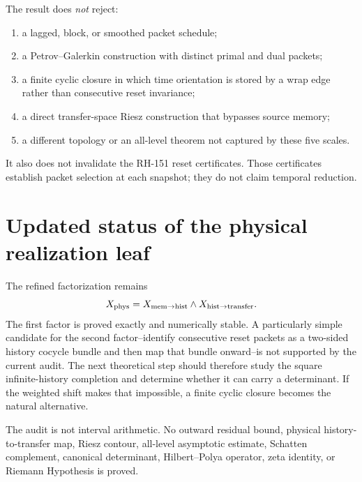 \documentclass[12pt]{article}
\theoremstyle{remark}
\begin{document}
The result does \emph{not} reject:
\begin{enumerate}[leftmargin=2em]
\item a lagged, block, or smoothed packet schedule;
\item a Petrov--Galerkin construction with distinct primal and dual packets;
\item a finite cyclic closure in which time orientation is stored by a wrap
edge rather than consecutive reset invariance;
\item a direct transfer-space Riesz construction that bypasses source memory;
\item a different topology or an all-level theorem not captured by these
five scales.
\end{enumerate}
It also does not invalidate the RH-151 reset certificates.  Those certificates
establish packet selection at each snapshot; they do not claim temporal
reduction.

\section{Updated status of the physical realization leaf}

The refined factorization remains
\[
 X_{\rm phys}
 =X_{\rm mem\to hist}\wedge X_{\rm hist\to transfer}.
\]
The first factor is proved exactly and numerically stable.  A particularly
simple candidate for the second factor--identify consecutive reset packets
as a two-sided history cocycle bundle and then map that bundle onward--is not
supported by the current audit.  The next theoretical step should therefore
study the square infinite-history completion and determine whether it can
carry a determinant.  If the weighted shift makes that impossible, a finite
cyclic closure becomes the natural alternative.

The audit is not interval arithmetic.  No outward residual bound, physical
history-to-transfer map, Riesz contour, all-level asymptotic estimate,
Schatten complement, canonical determinant, Hilbert--Polya operator, zeta
identity, or Riemann Hypothesis is proved.



\end{document}

